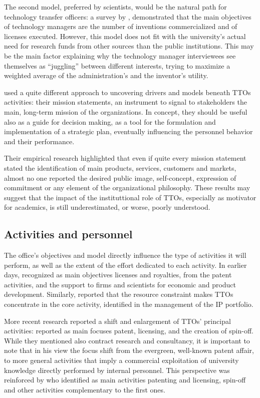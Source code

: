The second model, preferred by scientists, would be the natural path for technology transfer officers: a survey by \citet{Jensen1998}, demonstrated that the main objectives of technology managers are the number of inventions commercialized and of licenses executed. However, this model does not fit with the university's actual need for research funds from other sources than the public institutions. This may be the main factor explaining why the technology manager interviewees see themselves as \enquote{juggling} between different interests, trying to maximize a weighted average of the administration's and the inventor's utility.

\citet{Fitzgerald2015} used a quite different approach to uncovering drivers and models beneath TTOs activities: their mission statements, an instrument to signal to stakeholders the main, long-term mission of the organizations. In concept, they should be useful also as a guide for decision making, as a tool for the formulation and implementation of a strategic plan, eventually influencing the personnel behavior and their performance.

Their empirical research highlighted that even if quite every mission statement stated the identification of main products, services, customers and markets, almost no one reported the desired public image, self-concept, expression of commitment or any element of the organizational philosophy. These results may suggest that the impact of the instituttional role of TTOs, especially as motivator for academics, is still underestimated, or worse, poorly understood. 

\subsection{Activities and personnel}

The office's objectives and model directly influence the type of activities it will perform, as well as the extent of the effort dedicated to each activity. In earlier days, \citet{Siegel2003a} recognized as main objectives licenses and royalties, from the patent activities, and the support to firms and scientists for economic and product development. Similarly, \citet{OwenSmith2001} reported that the resource constraint makes TTOs concentrate in the core activity, identified in the management of the IP portfolio.

More recent research reported a shift and enlargement of TTOs' principal activities: \citet{Geuna2009} reported as main focuses patent, licensing, and the creation of spin-off. While they mentioned also contract research and consultancy, it is important to note that in his view the focus shift from the evergreen, well-known patent affair, to more general activities that imply a commercial exploitation of university knowledge directly performed by internal personnel. This perspective was reinforced by \citet{Balderi2010} who identified as main activities patenting and licensing, spin-off and other activities complementary to the first ones.

